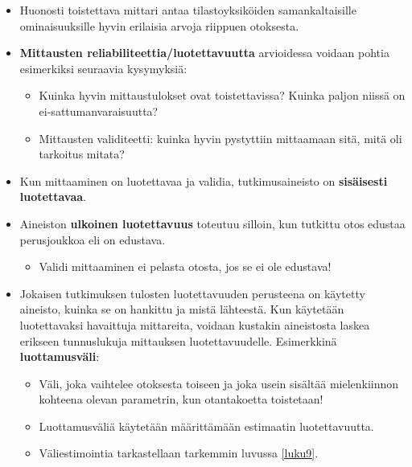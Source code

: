 \documentclass[
]{book}
\providecommand{\tightlist}{%
  \setlength{\itemsep}{0pt}\setlength{\parskip}{0pt}}
\begin{document}
\begin{itemize}
\item
  Huonosti toistettava mittari antaa tilastoyksiköiden samankaltaisille ominaisuuksille hyvin erilaisia arvoja riippuen otoksesta.
\item
  \textbf{Mittausten reliabiliteettia/luotettavuutta} arvioidessa voidaan pohtia esimerkiksi seuraavia kysymyksiä:

  \begin{itemize}
  \tightlist
  \item
    Kuinka hyvin mittaustulokset ovat toistettavissa? Kuinka paljon niissä on ei-sattumanvaraisuutta?
  \item
    Mittausten validiteetti: kuinka hyvin pystyttiin mittaamaan sitä, mitä oli tarkoitus mitata?
  \end{itemize}
\item
  Kun mittaaminen on luotettavaa ja validia, tutkimusaineisto on \textbf{sisäisesti luotettavaa}.
\item
  Aineiston \textbf{ulkoinen luotettavuus} toteutuu silloin, kun tutkittu otos edustaa perusjoukkoa eli on edustava.

  \begin{itemize}
  \tightlist
  \item
    Validi mittaaminen ei pelasta otosta, jos se ei ole edustava!
  \end{itemize}
\item
  Jokaisen tutkimuksen tulosten luotettavuuden perusteena on käytetty aineisto, kuinka se on hankittu ja mistä lähteestä. Kun käytetään luotettavaksi havaittuja mittareita, voidaan kustakin aineistosta laskea erikseen tunnuslukuja mittauksen luotettavuudelle. Esimerkkinä \textbf{luottamusväli}:

  \begin{itemize}
  \tightlist
  \item
    Väli, joka vaihtelee otoksesta toiseen ja joka usein sisältää mielenkiinnon kohteena olevan parametrin, kun otantakoetta toistetaan!
  \item
    Luottamusväliä käytetään määrittämään estimaatin luotettavuutta.
  \item
    Väliestimointia tarkastellaan tarkemmin luvussa \ref{luku9}.
  \end{itemize}
\end{itemize}
\end{document}
